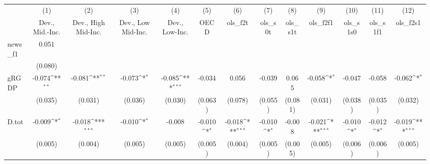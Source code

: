 {
\def\sym#1{\ifmmode^{#1}\else\(^{#1}\)\fi}
\begin{tabular}{l*{12}{c}}
\toprule
            &\multicolumn{1}{c}{(1)}&\multicolumn{1}{c}{(2)}&\multicolumn{1}{c}{(3)}&\multicolumn{1}{c}{(4)}&\multicolumn{1}{c}{(5)}&\multicolumn{1}{c}{(6)}&\multicolumn{1}{c}{(7)}&\multicolumn{1}{c}{(8)}&\multicolumn{1}{c}{(9)}&\multicolumn{1}{c}{(10)}&\multicolumn{1}{c}{(11)}&\multicolumn{1}{c}{(12)}\\
            &\multicolumn{1}{c}{Dev., Mid.-Inc.}&\multicolumn{1}{c}{Dev., High Mid-Inc.}&\multicolumn{1}{c}{Dev., Low Mid-Inc.}&\multicolumn{1}{c}{Dev., Low-Inc.}&\multicolumn{1}{c}{OECD}&\multicolumn{1}{c}{ols\_f2t}&\multicolumn{1}{c}{ols\_s0t}&\multicolumn{1}{c}{ols\_s1t}&\multicolumn{1}{c}{ols\_f2f1}&\multicolumn{1}{c}{ols\_s1s0}&\multicolumn{1}{c}{ols\_s1f1}&\multicolumn{1}{c}{ols\_f2s1}\\
\midrule
news\_f1     &       0.051         &                     &                     &                     &                     &                     &                     &                     &                     &                     &                     &                     \\
            &     (0.080)         &                     &                     &                     &                     &                     &                     &                     &                     &                     &                     &                     \\
\addlinespace
gRGDP       &      -0.074\sym{**} &      -0.081\sym{**} &      -0.073\sym{*}  &      -0.085\sym{***}&      -0.034         &       0.056         &      -0.039         &       0.065         &      -0.058\sym{*}  &      -0.047         &      -0.058         &      -0.062\sym{*}  \\
            &     (0.035)         &     (0.031)         &     (0.036)         &     (0.030)         &     (0.063)         &     (0.078)         &     (0.055)         &     (0.081)         &     (0.031)         &     (0.038)         &     (0.035)         &     (0.032)         \\
\addlinespace
D.tot       &      -0.009\sym{*}  &      -0.018\sym{***}&      -0.010\sym{*}  &      -0.008         &      -0.010\sym{*}  &      -0.018\sym{***}&      -0.010\sym{*}  &      -0.008         &      -0.021\sym{***}&      -0.010\sym{*}  &      -0.012\sym{*}  &      -0.019\sym{***}\\
            &     (0.005)         &     (0.004)         &     (0.005)         &     (0.005)         &     (0.005)         &     (0.004)         &     (0.005)         &     (0.005)         &     (0.005)         &     (0.006)         &     (0.006)         &     (0.005)         \\

\end{tabular}}
